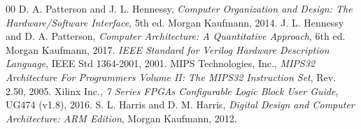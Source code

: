 \documentclass[conference]{IEEEtran}
\begin{document}
\begin{thebibliography}{00}
 D. A. Patterson and J. L. Hennessy, \textit{Computer Organization and Design: The Hardware/Software Interface}, 5th ed. Morgan Kaufmann, 2014.
 J. L. Hennessy and D. A. Patterson, \textit{Computer Architecture: A Quantitative Approach}, 6th ed. Morgan Kaufmann, 2017.
 \textit{IEEE Standard for Verilog Hardware Description Language}, IEEE Std 1364-2001, 2001.
 MIPS Technologies, Inc., \textit{MIPS32 Architecture For Programmers Volume II: The MIPS32 Instruction Set}, Rev. 2.50, 2005.
 Xilinx Inc., \textit{7 Series FPGAs Configurable Logic Block User Guide}, UG474 (v1.8), 2016.
 S. L. Harris and D. M. Harris, \textit{Digital Design and Computer Architecture: ARM Edition}, Morgan Kaufmann, 2012.
\end{thebibliography}
\end{document}
